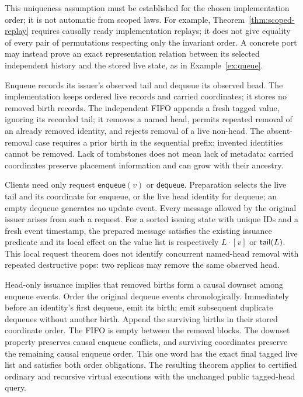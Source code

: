 This uniqueness assumption must be established for the chosen implementation
order; it is not automatic from scoped laws. For example,
Theorem~\ref{thm:scoped-replay} requires causally ready implementation replays;
it does not give equality of every pair of permutations respecting only the
invariant order. A concrete port may instead prove an exact representation
relation between its selected independent history and the stored live state,
as in Example~\ref{ex:queue}.

\begin{example}\label{ex:queue}
Enqueue records its issuer's observed tail and dequeue its observed head. The
implementation keeps ordered live records and carried coordinates; it stores
no removed birth records. The independent FIFO appends a fresh tagged value,
ignoring its recorded tail; it removes a named head, permits repeated removal
of an already removed identity, and rejects removal of a live non-head.
The absent-removal case requires a prior birth in the sequential prefix;
invented identities cannot be removed. Lack of tombstones does not mean lack
of metadata: carried coordinates preserve placement information and can grow
with their ancestry.

Clients need only request $\mathsf{enqueue}(v)$ or $\mathsf{dequeue}$.
Preparation selects the live tail and its coordinate for enqueue, or the live
head identity for dequeue; an empty dequeue generates no update event.
Every message allowed by the original issuer arises from such a request.
For a sorted issuing state with unique IDs and a fresh event timestamp,
the prepared message satisfies the existing issuance predicate and its local
effect on the value list is respectively $L\cdot[v]$ or $\mathsf{tail}(L)$.
This local request theorem does not identify concurrent named-head removal
with repeated destructive pops: two replicas may remove the same observed head.

Head-only issuance implies that removed births form a causal downset among
enqueue events. Order the original dequeue events chronologically. Immediately
before an identity's first dequeue, emit its birth; emit subsequent duplicate
dequeues without another birth. Append the surviving births in their stored
coordinate order. The FIFO is empty between the removal blocks. The downset
property preserves causal enqueue conflicts, and surviving coordinates preserve
the remaining causal enqueue order. This one word has the exact final tagged
live list and satisfies both order obligations. The resulting theorem applies
to certified ordinary and recursive virtual executions with the unchanged
public tagged-head query.
\end{example}

